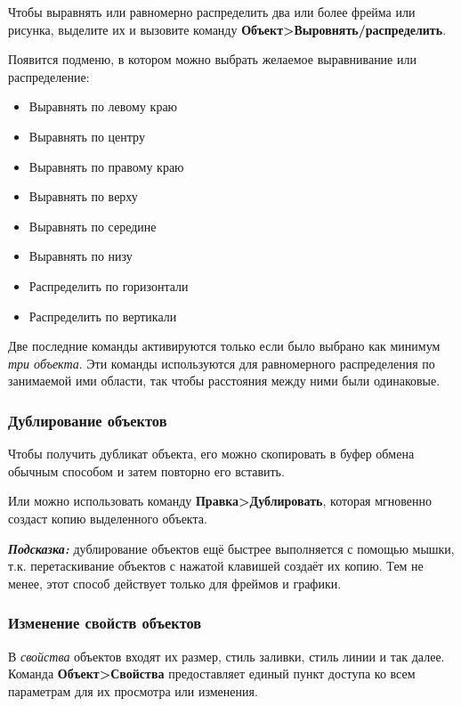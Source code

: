 \documentclass[a4paper,10pt]{article}
\begin{document}
Чтобы выравнять или равномерно распределить два или более фрейма или рисунка, выделите их и вызовите команду \textbf{Объект>Выровнять/распределить}.

Появится подменю, в котором можно выбрать желаемое выравнивание или распределение:

\begin{itemize}
 \item Выравнять по левому краю
 \item Выравнять по центру
 \item Выравнять по правому краю
 \item Выравнять по верху
 \item Выравнять по середине
 \item Выравнять по низу
 \newline
 \item Распределить по горизонтали
 \item Распределить по вертикали
\end{itemize}

Две последние команды активируются только если было выбрано как минимум \textit{три объекта}. Эти команды используются для равномерного распределения по занимаемой ими области, так чтобы расстояния между ними были одинаковые.

\subsubsection{Дублирование объектов}
Чтобы получить дубликат объекта, его можно скопировать в буфер обмена обычным способом и затем повторно его вставить.

Или можно использовать команду \textbf{Правка>Дублировать}, которая мгновенно создаст копию выделенного объекта.

\begin{mdframed}[backgroundcolor=blue!10]
\textbf{\textit{Подсказка:}} дублирование объектов ещё быстрее выполняется с помощью мышки, т.к. перетаскивание объектов с нажатой клавишей  создаёт их копию. Тем не менее, этот способ действует только для фреймов и графики.
\end{mdframed}

\subsubsection{Изменение свойств объектов}
В \textit{свойства} объектов входят их размер, стиль заливки, стиль линии и так далее. Команда \textbf{Объект>Свойства} предоставляет единый пункт доступа ко всем параметрам для их просмотра или изменения.
\end{document}
